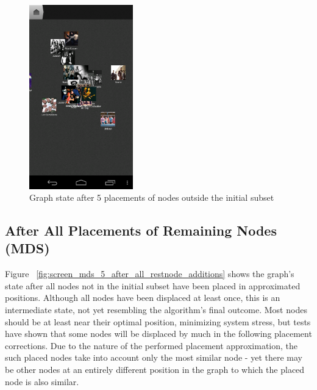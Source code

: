 \begin{figure}[H]
  \centering
    \includegraphics[width=0.4\textwidth]{figures/screen_mds_4_after_5_restnode_additions}
  \caption{Graph state after 5 placements of nodes outside the initial subset}
  \label{fig:screen_mds_4_after_5_restnode_additions}
\end{figure}

\newpage
\subsection{After All Placements of Remaining Nodes (MDS)}

Figure ~\ref{fig:screen_mds_5_after_all_restnode_additions} shows the graph's state after all nodes not in the initial subset have been placed in approximated positions. Although all nodes have been displaced at least once, this is an intermediate state, not yet resembling the algorithm's final outcome. Most nodes should be at least near their optimal position, minimizing system stress, but tests have shown that some nodes will be displaced by much in the following placement corrections. Due to the nature of the performed placement approximation, the such placed nodes take into account only the most similar node - yet there may be other nodes at an entirely different position in the graph to which the placed node is also similar.

